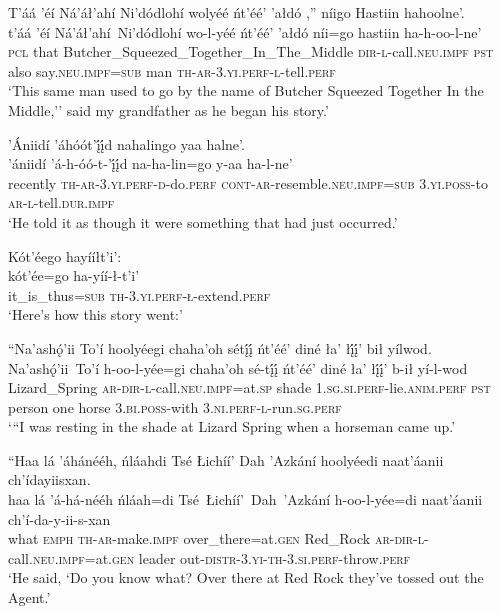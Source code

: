 \ea\label{ex:text2-9-3}
T’áá ’éí Ná’áł’ahí Ni’dódlohí wolyéé ńt’éé’ ’ałdó ,'' níigo Hastiin hahoolne’.\\
\gll t’áá ’éí	Ná’áł’ahí~{Ni’dódlohí}	wo-l-yéé	ńt’éé’	’ałdó	níi=go	hastiin	ha-h-oo-l-ne’\\
     \textsc{pcl} that	Butcher\_Squeezed\_Together\_In\_The\_Middle	\textsc{dir}-\textsc{l}-call.\textsc{neu}.\textsc{impf}	\textsc{pst}	also	say.\textsc{neu}.\textsc{impf}=\textsc{sub}	man	\textsc{th}-\textsc{ar}-3.\textsc{yi}.\textsc{perf}-\textsc{l}-tell.\textsc{perf}\\
\glt `This same man used to go by the name of Butcher Squeezed Together In the Middle,'' said my grandfather as he began his story.'
\z

\ea\label{ex:text2-9-4}
’Ániidí ’áhóót’į́į́d nahalingo yaa halne’.\\
\gll ’ániidí	’á-h-óó-t-’į́į́d	na-ha-lin=go	y-aa	ha-l-ne’\\
     recently	\textsc{th}-\textsc{ar}-3.\textsc{yi}.\textsc{perf}-\textsc{d}-do.\textsc{perf}	\textsc{cont}-\textsc{ar}-resemble.\textsc{neu}.\textsc{impf}=\textsc{sub}	3.\textsc{yi}.\textsc{poss}-to	\textsc{ar}-\textsc{l}-tell.\textsc{dur}.\textsc{impf}\\
\glt `He told it as though it were something that had just occurred.'
\z

\ea\label{ex:text2-9-5}
Kót’éego hayííłt’i’:\\
\gll kót’ée=go	ha-yíí-ł-t’i’\\
     it\_is\_thus=\textsc{sub}	\textsc{th}-3.\textsc{yi}.\textsc{perf}-\textsc{ł}-extend.\textsc{perf}\\
\glt `Here's how this story went:'
\z

\ea\label{ex:text2-10-1}
``Na’ashǫ́’ii To’í hoolyéegi chaha’oh sétį́į́ ńt’éé’ diné ła’ łį́į́’ bił yílwod.\\
\gll Na’ashǫ́’ii~{To’í}	h-oo-l-yée=gi	chaha’oh	sé-tį́į́	ńt’éé’	diné	ła’	łį́į́’	b-ił	yí-l-wod\\
     Lizard\_Spring	\textsc{ar}-\textsc{dir}-\textsc{l}-call.\textsc{neu}.\textsc{impf}=at.\textsc{sp}	shade	1.\textsc{sg}.\textsc{si}.\textsc{perf}-lie.\textsc{anim}.\textsc{perf}	\textsc{pst}	person	one	horse	3.\textsc{bi}.\textsc{poss}-with	3.\textsc{ni}.\textsc{perf}-\textsc{l}-run.\textsc{sg}.\textsc{perf}\\
\glt `{``}I was resting in the shade at Lizard Spring when a horseman came up.'
\z

\ea\label{ex:text2-10-2}
``Haa lá ’áhánééh, ńláahdi Tsé Łichíí’ Dah ’Azkání hoolyéedi naat’áanii ch’ídayiisxan.\\
\gll haa	lá	’á-há-nééh	ńláah=di	Tsé~Łichíí’~Dah~{’Azkání}	h-oo-l-yée=di	naat’áanii	ch’í-da-y-ii-s-xan\\
     what	\textsc{emph}	\textsc{th}-\textsc{ar}-make.\textsc{impf}	over\_there=at.\textsc{gen}	Red\_Rock	\textsc{ar}-\textsc{dir}-\textsc{l}-call.\textsc{neu}.\textsc{impf}=at.\textsc{gen}	leader	out-\textsc{distr}-3.\textsc{yi}-\textsc{th}-3.\textsc{si}.\textsc{perf}-throw.\textsc{perf}\\
\glt `He said, `Do you know what? Over there at Red Rock they've tossed out the Agent.'
\z

